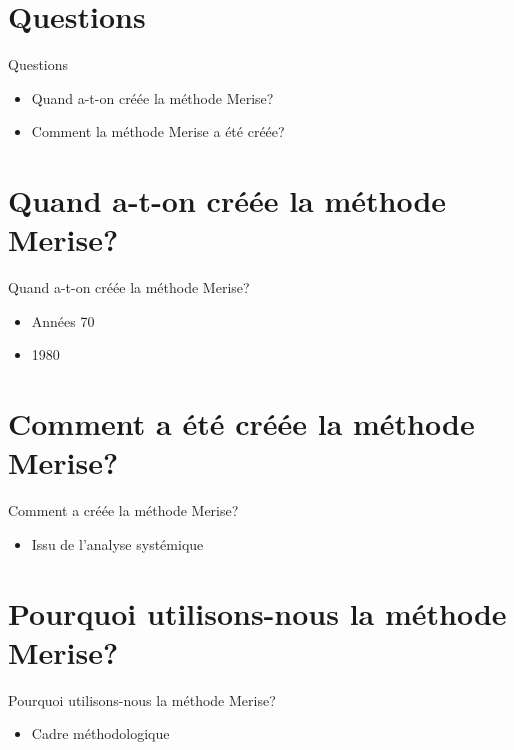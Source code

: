 \documentclass{beamer}
\begin{document}
\section{Questions}
\begin{frame}{Questions}
\begin{itemize}
  \item Quand a-t-on créée la méthode Merise?
  \item Comment la méthode Merise a été créée?
\end{itemize}
\vskip 5cm
\end{frame}

\section{Quand a-t-on créée la méthode Merise?}
\begin{frame}{Quand a-t-on créée la méthode Merise?}
\begin{itemize}
  \item Années 70
  \item 1980
\end{itemize}
\vskip 5cm
\end{frame}

\section{Comment a été créée la méthode Merise?}
\begin{frame}{Comment a créée la méthode Merise?}
\begin{itemize}
  \item Issu de l'analyse systémique
\end{itemize}
\vskip 5cm
\end{frame}

\section{Pourquoi utilisons-nous la méthode Merise?}
\begin{frame}{Pourquoi utilisons-nous la méthode Merise?}
\begin{itemize}
  \item Cadre méthodologique
\end{itemize}
\vskip 5cm
\end{frame}
\end{document}
